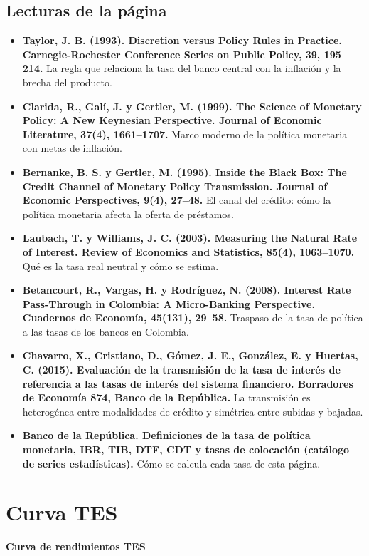 \section*{Lecturas de la página}
\begin{itemize}\small
\item \textbf{Taylor, J. B. (1993). Discretion versus Policy Rules in Practice. Carnegie-Rochester Conference Series on Public Policy, 39, 195–214.} La regla que relaciona la tasa del banco central con la inflación y la brecha del producto.
\item \textbf{Clarida, R., Galí, J. y Gertler, M. (1999). The Science of Monetary Policy: A New Keynesian Perspective. Journal of Economic Literature, 37(4), 1661–1707.} Marco moderno de la política monetaria con metas de inflación.
\item \textbf{Bernanke, B. S. y Gertler, M. (1995). Inside the Black Box: The Credit Channel of Monetary Policy Transmission. Journal of Economic Perspectives, 9(4), 27–48.} El canal del crédito: cómo la política monetaria afecta la oferta de préstamos.
\item \textbf{Laubach, T. y Williams, J. C. (2003). Measuring the Natural Rate of Interest. Review of Economics and Statistics, 85(4), 1063–1070.} Qué es la tasa real neutral y cómo se estima.
\item \textbf{Betancourt, R., Vargas, H. y Rodríguez, N. (2008). Interest Rate Pass-Through in Colombia: A Micro-Banking Perspective. Cuadernos de Economía, 45(131), 29–58.} Traspaso de la tasa de política a las tasas de los bancos en Colombia.
\item \textbf{Chavarro, X., Cristiano, D., Gómez, J. E., González, E. y Huertas, C. (2015). Evaluación de la transmisión de la tasa de interés de referencia a las tasas de interés del sistema financiero. Borradores de Economía 874, Banco de la República.} La transmisión es heterogénea entre modalidades de crédito y simétrica entre subidas y bajadas.
\item \textbf{Banco de la República. Definiciones de la tasa de política monetaria, IBR, TIB, DTF, CDT y tasas de colocación (catálogo de series estadísticas).} Cómo se calcula cada tasa de esta página.
\end{itemize}

\chapter{Curva TES}
\label{atlas:curva-tes}

{\large\sffamily\bfseries Curva de rendimientos TES\par}\medskip


